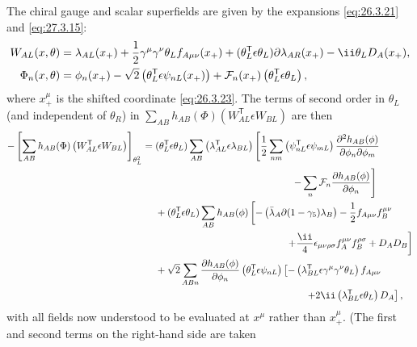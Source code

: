 The chiral gauge and scalar superfields are given by the expansions
\eqref{eq:26.3.21} and \eqref{eq:27.3.15}:
\[
  \begin{aligned}
  W_{AL}(x,\theta)={}&
  \lambda_{AL}(x_+)
  +\frac12\gamma^\mu\gamma^\nu\theta_Lf_{A\mu\nu}(x_+)
  +(\theta_L^{\mathsf T}\epsilon\theta_L)
    \sl{\partial}\lambda_{AR}(x_+)
  -\ii\theta_LD_A(x_+),
  \\
  \Phi_n(x,\theta)={}&
  \phi_n(x_+)
  -\sqrt{2}\left(\theta_L^{\mathsf T}\epsilon\psi_{nL}(x_+)\right)
  +\mathcal{F}_n(x_+)
    \left(\theta_L^{\mathsf T}\epsilon\theta_L\right),
  \end{aligned}
\]
where \(x_+^\mu\) is the shifted coordinate \eqref{eq:26.3.23}. The terms of
second order in \(\theta_L\) (and independent of \(\theta_R\)) in
\(\sum_{AB}h_{AB}(\Phi)(W_{AL}^{\mathsf T}\epsilon W_{BL})\) are then
\[
  \begin{aligned}
  -\left[
    \sum_{AB}h_{AB}(\Phi)
    \left(W_{AL}^{\mathsf T}\epsilon W_{BL}\right)
  \right]_{\theta_L^2}
  ={}&
  (\theta_L^{\mathsf T}\epsilon\theta_L)
  \sum_{AB}\left(\lambda_{AL}^{\mathsf T}\epsilon\lambda_{BL}\right)
  \left[
    \frac12\sum_{nm}
      \left(\psi_{nL}^{\mathsf T}\epsilon\psi_{mL}\right)
      \frac{\partial^2h_{AB}(\phi)}
           {\partial\phi_n\partial\phi_m}
  \right.
  \\
  &\hspace{49mm}\left.
    -\sum_n\mathcal{F}_n
      \frac{\partial h_{AB}(\phi)}{\partial\phi_n}
  \right]
  \\
  &+(\theta_L^{\mathsf T}\epsilon\theta_L)
  \sum_{AB}h_{AB}(\phi)
  \left[
    -\left(\bar\lambda_A\sl{\partial}
      (1-\gamma_5)\lambda_B\right)
    -\frac12f_{A\mu\nu}f_B^{\mu\nu}
  \right.
  \\
  &\hspace{47mm}\left.
    +\frac{\ii}{4}\epsilon_{\mu\nu\rho\sigma}
      f_A^{\mu\nu}f_B^{\rho\sigma}
    +D_AD_B
  \right]
  \\
  &+\sqrt{2}\sum_{ABn}
  \frac{\partial h_{AB}(\phi)}{\partial\phi_n}
  \left(\theta_L^{\mathsf T}\epsilon\psi_{nL}\right)
  \left[
    -\left(\lambda_{BL}^{\mathsf T}
      \epsilon\gamma^\mu\gamma^\nu\theta_L\right)f_{A\mu\nu}
  \right.
  \\
  &\hspace{54mm}\left.
    +2\ii\left(\lambda_{BL}^{\mathsf T}\epsilon\theta_L\right)D_A
  \right],
  \end{aligned}
\]
with all fields now understood to be evaluated at \(x^\mu\) rather than
\(x_+^\mu\). (The first and second terms on the right-hand side are taken
